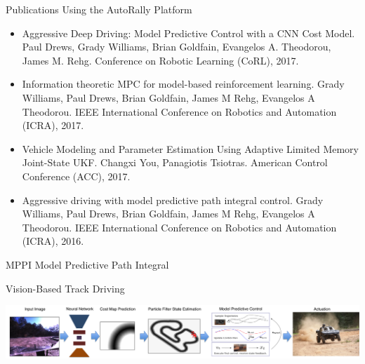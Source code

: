 \documentclass[aspectratio=169]{beamer}
\begin{document}
\begin{frame}{Publications Using the AutoRally Platform}
\begin{multicols}{2}
\begin{itemize}
		\item Aggressive Deep Driving: Model Predictive Control with a CNN Cost Model. Paul Drews, Grady Williams, Brian Goldfain, Evangelos A. Theodorou, James M. Rehg. Conference on Robotic Learning (CoRL), 2017.
		\item Information theoretic MPC for model-based reinforcement learning. Grady Williams, Paul Drews, Brian Goldfain, James M Rehg, Evangelos A Theodorou. IEEE International Conference on Robotics and Automation (ICRA), 2017.
		\item Vehicle Modeling and Parameter Estimation Using Adaptive Limited Memory Joint-State UKF. Changxi You, Panagiotis Tsiotras. American Control Conference (ACC), 2017.
		\item \alert{Aggressive driving with model predictive path integral control. Grady Williams, Paul Drews, Brian Goldfain, James M Rehg, Evangelos A Theodorou. IEEE International Conference on Robotics and Automation (ICRA), 2016.}
	\end{itemize}
\end{multicols}
\end{frame}

\begin{frame}{MPPI}
Model Predictive Path Integral
\end{frame}

\begin{frame}{Vision-Based Track Driving}
\begin{center}
	\includegraphics[width=\linewidth]{nn_vision_flow.png}
\end{center}
\end{frame}
\end{document}
